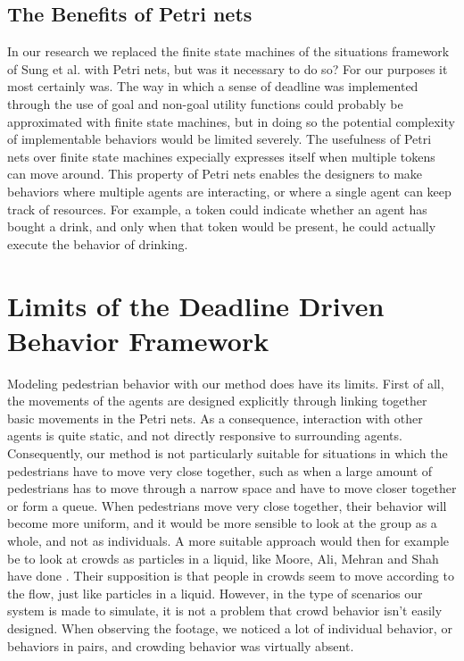 \documentclass[11pt, a4paper]{book}
\begin{document}
\subsection{The Benefits of Petri nets}
\label{sec:benefits}
In our research we replaced the finite state machines of the situations framework of Sung et al. with Petri nets, but was it necessary to do so? For our purposes it most certainly was. The way in which a sense of deadline was implemented through the use of goal and non-goal utility functions could probably be approximated with finite state machines, but in doing so the potential complexity of implementable behaviors would be limited severely. The usefulness of Petri nets over finite state machines expecially expresses itself when multiple tokens can move around. This property of Petri nets enables the designers to make behaviors where multiple agents are interacting, or where a single agent can keep track of resources. For example, a token could indicate whether an agent has bought a drink, and only when that token would be present, he could actually execute the behavior of drinking.

%
%
%


\section{Limits of the Deadline Driven Behavior Framework}
Modeling pedestrian behavior with our method does have its limits. First of all, the movements of the agents are designed explicitly through linking together basic movements in the Petri nets. As a consequence, interaction with other agents is quite static, and not directly responsive to surrounding agents. Consequently, our method is not particularly suitable for situations in which the pedestrians have to move very close together, such as when a large amount of pedestrians has to move through a narrow space and have to move closer together or form a queue. When pedestrians move very close together, their behavior will become more uniform, and it would be more sensible to look at the group as a whole, and not as individuals. A more suitable approach would then for example be to look at crowds as particles in a liquid, like Moore, Ali, Mehran and Shah have done \cite{Moore:2011:VCS:2043174.2043192}. Their supposition is that people in crowds seem to move according to the flow, just like particles in a liquid. However, in the type of scenarios our system is made to simulate, it is not a problem that crowd behavior isn't easily designed. When observing the footage, we noticed a lot of individual behavior, or behaviors in pairs, and crowding behavior was virtually absent.
\end{document}
